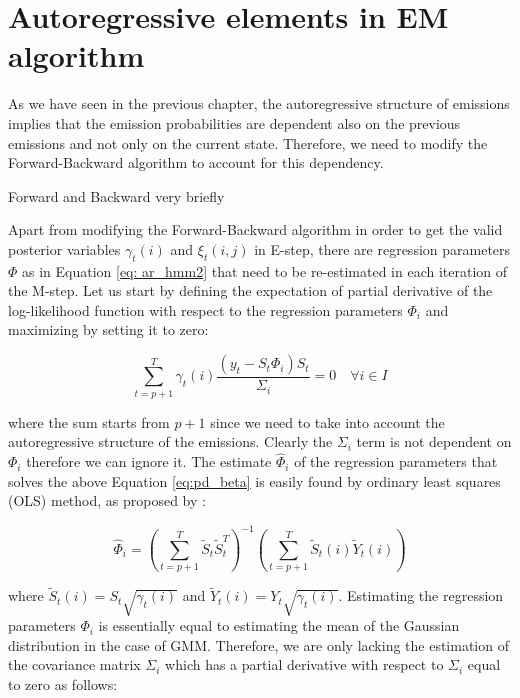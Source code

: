 \section{Autoregressive elements in EM algorithm}

As we have seen in the previous chapter, the autoregressive structure of emissions implies that the emission probabilities are dependent also on the previous emissions and not only 
on the current state. Therefore, we need to modify the Forward-Backward algorithm to account for this dependency. \citep{Xuan2004}

Forward and Backward very briefly

Apart from modifying the Forward-Backward algorithm in order to get the valid posterior variables $\gamma_t(i)$ and $\xi_t(i,j)$ in E-step, there are 
regression parameters $\Phi$ as in Equation \ref{eq: ar_hmm2} that need to be re-estimated in each iteration of the M-step. Let us start by defining the 
expectation of partial derivative of the log-likelihood function with respect to the regression parameters $\Phi_{i}$ and maximizing by setting it to zero:

\begin{equation} \label{eq:pd_beta}
    \sum_{t=p+1}^{T} \gamma_t(i) \frac{(y_t - S_t \Phi_{i})S_t}{\Sigma_i} = 0 \quad \forall i \in I
\end{equation}

where the sum starts from $p+1$ since we need to take into account the autoregressive structure of the emissions. Clearly the $\Sigma_i$ term is not dependent on $\Phi_i$ therefore we can
ignore it. The estimate $\hat{\Phi}_i$ of the regression parameters that solves the above Equation \ref{eq:pd_beta} is easily found by ordinary least squares (OLS) method, as proposed by \citep{Xuan2004}:

\begin{equation}
    \hat{\Phi}_i = \left( \sum_{t=p+1}^{T} \tilde{S}_t \tilde{S}_t^T \right)^{-1} \left( \sum_{t=p+1}^{T} \tilde{S}_t(i) \tilde{Y}_t(i) \right)
\end{equation}

where $\tilde{S}_t(i) = S_t \sqrt{\gamma_t(i)}$ and $\tilde{Y}_t(i) = Y_t \sqrt{\gamma_t(i)}$. Estimating the regression parameters $\Phi_i$ is essentially 
equal to estimating the mean of the Gaussian distribution in the case of GMM. Therefore, we are only lacking the estimation of the covariance matrix $\Sigma_i$
which has a partial derivative with respect to $\Sigma_i$ equal to zero as follows:

